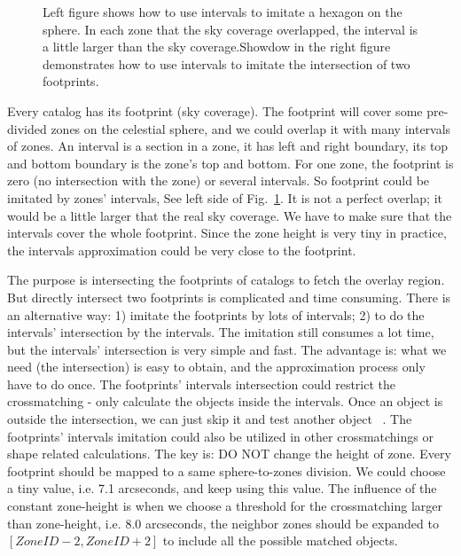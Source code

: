 \documentclass[11pt,twoside]{article}
\begin{document}
\begin{figure}
\begin{center}
\caption{{Left figure shows how to use intervals to imitate a hexagon on the sphere. In each zone that the sky coverage overlapped, the interval is a little larger than the sky coverage.}{Showdow in the right figure demonstrates how to use intervals to imitate the intersection of two footprints.}\label{P046_f2}}
\end{center}
\end{figure}

Every catalog has its footprint (sky coverage). The footprint will cover some pre-divided zones on the celestial sphere, and we could overlap it with many intervals of zones. An interval is a section in a zone, it has left and right boundary, its top and bottom boundary is the zone's top and bottom. For one zone, the footprint is zero (no intersection with the zone) or several intervals. So footprint could be imitated by zones' intervals, See left side of Fig.~\ref{P046_f2}. It is not a perfect overlap; it would be a little larger that the real sky coverage. We have to make sure that the intervals cover the whole footprint. Since the zone height is very tiny in practice, the intervals approximation could be very close to the footprint.

The purpose is intersecting the footprints of catalogs to fetch the overlay region. But directly intersect two footprints is complicated and time consuming. There is an alternative way: 1) imitate the footprints by lots of intervals; 2) to do the intervals' intersection by the intervals. The imitation still consumes a lot time, but the intervals' intersection is very simple and fast. The advantage is: what we need (the intersection) is easy to obtain, and the approximation process only have to do once. The footprints' intervals intersection could restrict the crossmatching - only calculate the objects inside the intervals. Once an object is outside the intersection, we can just skip it and test another object ~\citep{dongwei}. The footprints' intervals imitation could also be utilized in other crossmatchings or shape related calculations. The key is: DO NOT change the height of zone. Every footprint should be mapped to a same sphere-to-zones division. We could choose a tiny value, i.e. 7.1 arcseconds, and keep using this value. The influence of the constant zone-height is when we choose a threshold for the crossmatching larger than zone-height, i.e. 8.0 arcseconds, the neighbor zones should be expanded to $\left[\textit{ZoneID}-2,\textit{ZoneID}+2\right]$ to include all the possible matched objects. 
\end{document}
